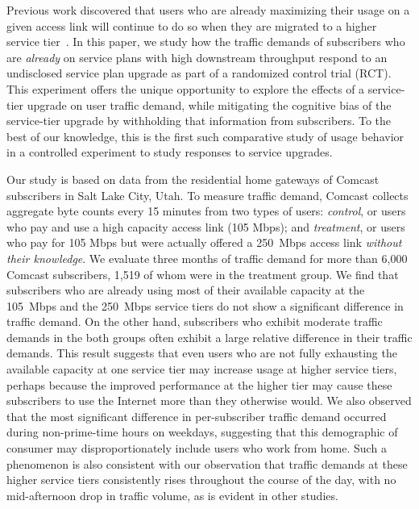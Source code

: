 
Previous work discovered that users who are already maximizing their
usage on a given access link will continue to do so when they are
migrated to a higher service tier~\cite{dasu-imc2014}. In this paper, we
study how the traffic demands of subscribers who are {\em already} on service
plans with high downstream throughput respond to an undisclosed service
plan upgrade as part of a randomized control trial (RCT). This
experiment offers the unique opportunity to explore the effects of a
service-tier upgrade on user traffic demand, while mitigating the
cognitive bias of the service-tier upgrade by withholding that
information from subscribers. To the best of our knowledge, this is the
first such comparative study of usage behavior in a controlled
experiment to study responses to service upgrades.

Our study is based on data from the residential home gateways
of Comcast subscribers in Salt Lake City, Utah. To measure traffic
demand, Comcast collects aggregate byte counts every 15 minutes from two
types of users: {\em control}, or users who pay and use a high capacity
access link (105 Mbps); and {\em treatment}, or users who pay for 105
Mbps but were actually offered a 250~Mbps access link {\em without their
  knowledge}.  We evaluate three months of traffic demand for more than
6,000 Comcast subscribers, 1,519 of whom were in the treatment group.
We find that subscribers who are already using most of their available
capacity at the 105~Mbps and the 250~Mbps service tiers do not show a significant
difference in traffic demand.  On the other hand, subscribers who
exhibit moderate traffic demands in the both groups often exhibit a large
relative difference in their traffic demands.
This result suggests that
 even users who are not fully exhausting the available capacity at
one service tier may increase usage at higher service tiers, perhaps because the
improved performance at the higher tier may cause these subscribers to
use the Internet more than they otherwise would. We also observed that
the most significant difference in per-subscriber traffic demand
 occurred during non-prime-time hours on weekdays,
suggesting that this demographic of consumer may disproportionately
include users who work from home.  Such a phenomenon is also consistent
with our observation that traffic demands at these higher service
tiers consistently rises throughout the course of the day, with no
mid-afternoon drop in traffic volume, as is evident in other studies.

